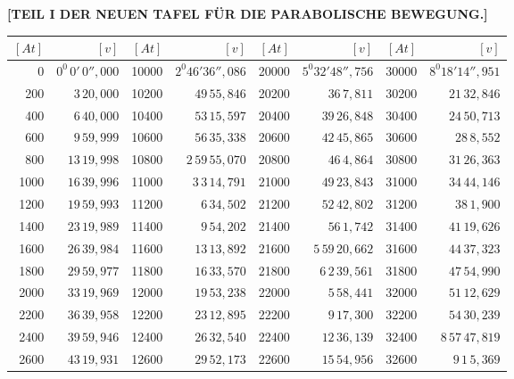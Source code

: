 \clearpage
{}
\begingroup
\centering
\fontsize{9}{9}\selectfont
\setlength{\tabcolsep}{3pt}
\renewcommand{\arraystretch}{.9}
\setlength{\parskip}{0pt}
\textbf{[TEIL I DER NEUEN TAFEL FÜR DIE PARABOLISCHE BEWEGUNG.]}
\par\vspace{7pt}
\begin{tabular}{|r|r||r|r||r|r||r|r|}
\hline
\([At]\) & \([v]\) & \([At]\) & \([v]\) & \([At]\) & \([v]\) & \([At]\) & \([v]\) \\
\hline
0 & \(0^{0}\,0'\,0'',000\) & 10000 & \(2^{0}46'36'',086\) & 20000 & \(5^{0}32'48'',756\) & 30000 & \(8^{0}18'14'',951\) \\[1pt]
200 & \(3\,20,000\) & 10200 & \(49\,55,846\) & 20200 & \(36\,7,811\) & 30200 & \(21\,32,846\) \\
400 & \(6\,40,000\) & 10400 & \(53\,15,597\) & 20400 & \(39\,26,848\) & 30400 & \(24\,50,713\) \\
600 & \(9\,59,999\) & 10600 & \(56\,35,338\) & 20600 & \(42\,45,865\) & 30600 & \(28\,8,552\) \\
800 & \(13\,19,998\) & 10800 & \(2\,59\,55,070\) & 20800 & \(46\,4,864\) & 30800 & \(31\,26,363\) \\[1pt]
1000 & \(16\,39,996\) & 11000 & \(3\,3\,14,791\) & 21000 & \(49\,23,843\) & 31000 & \(34\,44,146\) \\[1pt]
1200 & \(19\,59,993\) & 11200 & \(6\,34,502\) & 21200 & \(52\,42,802\) & 31200 & \(38\,1,900\) \\
1400 & \(23\,19,989\) & 11400 & \(9\,54,202\) & 21400 & \(56\,1,742\) & 31400 & \(41\,19,626\) \\
1600 & \(26\,39,984\) & 11600 & \(13\,13,892\) & 21600 & \(5\,59\,20,662\) & 31600 & \(44\,37,323\) \\
1800 & \(29\,59,977\) & 11800 & \(16\,33,570\) & 21800 & \(6\,2\,39,561\) & 31800 & \(47\,54,990\) \\[1pt]
2000 & \(33\,19,969\) & 12000 & \(19\,53,238\) & 22000 & \(5\,58,441\) & 32000 & \(51\,12,629\) \\[1pt]
2200 & \(36\,39,958\) & 12200 & \(23\,12,895\) & 22200 & \(9\,17,300\) & 32200 & \(54\,30,239\) \\
2400 & \(39\,59,946\) & 12400 & \(26\,32,540\) & 22400 & \(12\,36,139\) & 32400 & \(8\,57\,47,819\) \\
2600 & \(43\,19,931\) & 12600 & \(29\,52,173\) & 22600 & \(15\,54,956\) & 32600 & \(9\,1\,5,369\) \\

\end{tabular}
